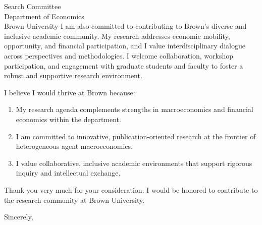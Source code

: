 \documentclass[11pt,letterpaper]{letter}
\begin{document}
\begin{letter}{
Search Committee \\
Department of Economics \\
Brown University
}
I am also committed to contributing to Brown’s diverse and inclusive academic community. My research addresses economic mobility, opportunity, and financial participation, and I value interdisciplinary dialogue across perspectives and methodologies. I welcome collaboration, workshop participation, and engagement with graduate students and faculty to foster a robust and supportive research environment.

I believe I would thrive at Brown because:
\begin{enumerate}
    \item My research agenda complements strengths in macroeconomics and financial economics within the department.
    \item I am committed to innovative, publication-oriented research at the frontier of heterogeneous agent macroeconomics.
    \item I value collaborative, inclusive academic environments that support rigorous inquiry and intellectual exchange.
\end{enumerate}

Thank you very much for your consideration. I would be honored to contribute to the research community at Brown University.

\closing{Sincerely,}

\end{letter}
\end{document}
